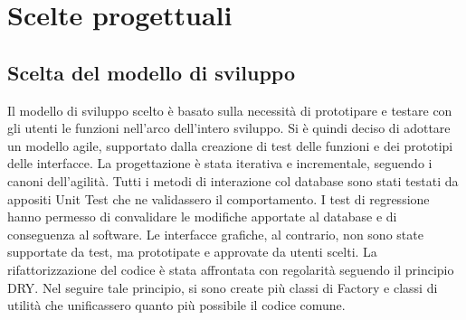 \chapter{Scelte progettuali}\label{chap:ScelteProgettuali}
\section{Scelta del modello di sviluppo}
Il modello di sviluppo scelto è basato sulla necessità di prototipare e testare
con gli utenti le funzioni nell'arco dell'intero sviluppo.
Si è quindi deciso di adottare un modello agile,
supportato dalla creazione di test delle funzioni e dei prototipi delle interfacce.
La progettazione è stata iterativa e incrementale, seguendo i canoni dell'agilità.
Tutti i metodi di interazione col database sono stati testati da appositi Unit Test
che ne validassero il comportamento.
I test di regressione hanno permesso di convalidare le modifiche apportate al database e di
conseguenza al software.
Le interfacce grafiche, al contrario, non sono state supportate da test, ma prototipate e
approvate da utenti scelti.
La rifattorizzazione del codice è stata affrontata con regolarità seguendo il principio \ac{DRY}.
Nel seguire tale principio, si sono create più classi di Factory e classi di utilità
che unificassero quanto più possibile il codice comune.

